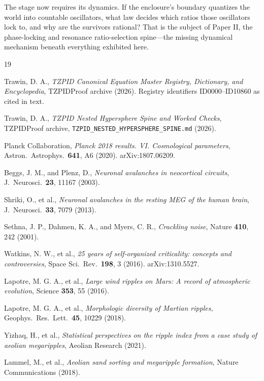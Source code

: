 \documentclass[11pt]{article}
\theoremstyle{remark}
\begin{document}
The stage now requires its dynamics. If the enclosure's boundary quantizes the world into countable oscillators, what law decides which ratios those oscillators lock to, and why are the survivors rational? That is the subject of Paper II, the phase-locking and resonance ratio-selection spine---the missing dynamical mechanism beneath everything exhibited here.

\begin{thebibliography}{19}

 Trawin, D. A., \emph{TZPID Canonical Equation Master Registry, Dictionary, and Encyclopedia}, TZPIDProof archive (2026). Registry identifiers ID0000--ID10860 as cited in text.

 Trawin, D. A., \emph{TZPID Nested Hypersphere Spine and Worked Checks}, TZPIDProof archive, \texttt{TZPID\_NESTED\_HYPERSPHERE\_SPINE.md} (2026).

 Planck Collaboration, \emph{Planck 2018 results. VI. Cosmological parameters}, Astron.\ Astrophys.\ \textbf{641}, A6 (2020). arXiv:1807.06209.

 Beggs, J. M., and Plenz, D., \emph{Neuronal avalanches in neocortical circuits}, J.\ Neurosci.\ \textbf{23}, 11167 (2003).

 Shriki, O., et al., \emph{Neuronal avalanches in the resting MEG of the human brain}, J.\ Neurosci.\ \textbf{33}, 7079 (2013).

 Sethna, J. P., Dahmen, K. A., and Myers, C. R., \emph{Crackling noise}, Nature \textbf{410}, 242 (2001).

 Watkins, N. W., et al., \emph{25 years of self-organized criticality: concepts and controversies}, Space Sci.\ Rev.\ \textbf{198}, 3 (2016). arXiv:1310.5527.

 Lapotre, M. G. A., et al., \emph{Large wind ripples on Mars: A record of atmospheric evolution}, Science \textbf{353}, 55 (2016).

 Lapotre, M. G. A., et al., \emph{Morphologic diversity of Martian ripples}, Geophys.\ Res.\ Lett.\ \textbf{45}, 10229 (2018).

 Yizhaq, H., et al., \emph{Statistical perspectives on the ripple index from a case study of aeolian megaripples}, Aeolian Research (2021).

 Lammel, M., et al., \emph{Aeolian sand sorting and megaripple formation}, Nature Communications (2018).


\end{thebibliography}
\end{document}
